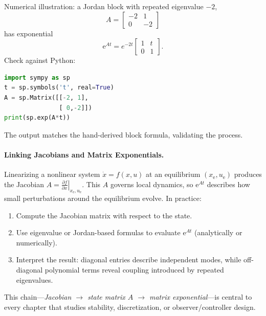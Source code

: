 Numerical illustration: a Jordan block with repeated eigenvalue $-2$,
\[
    A = \begin{bmatrix}-2 & 1\\ 0 & -2\end{bmatrix}
\]
has exponential
\[
    \mathrm{e}^{A t} = e^{-2 t} \begin{bmatrix}1 & t \\ 0 & 1\end{bmatrix}.
\]
Check against Python:
\begin{lstlisting}[language=python]
import sympy as sp
t = sp.symbols('t', real=True)
A = sp.Matrix([[-2, 1],
               [ 0,-2]])
print(sp.exp(A*t))
\end{lstlisting}
The output matches the hand-derived block formula, validating the process.

\paragraph{Linking Jacobians and Matrix Exponentials.}
Linearizing a nonlinear system $\dot{x} = f(x,u)$ at an equilibrium $(x_\text{e},u_\text{e})$ produces the Jacobian $A = \left.\frac{\partial f}{\partial x}\right|_{x_\text{e},u_\text{e}}$. This $A$ governs local dynamics, so $\mathrm{e}^{A t}$ describes how small perturbations around the equilibrium evolve. In practice:
\begin{enumerate}[leftmargin=*]
    \item Compute the Jacobian matrix with respect to the state.
    \item Use eigenvalue or Jordan-based formulas to evaluate $\mathrm{e}^{A t}$ (analytically or numerically).
    \item Interpret the result: diagonal entries describe independent modes, while off-diagonal polynomial terms reveal coupling introduced by repeated eigenvalues.
\end{enumerate}
This chain—\emph{Jacobian $\rightarrow$ state matrix $A$ $\rightarrow$ matrix exponential}—is central to every chapter that studies stability, discretization, or observer/controller design.

